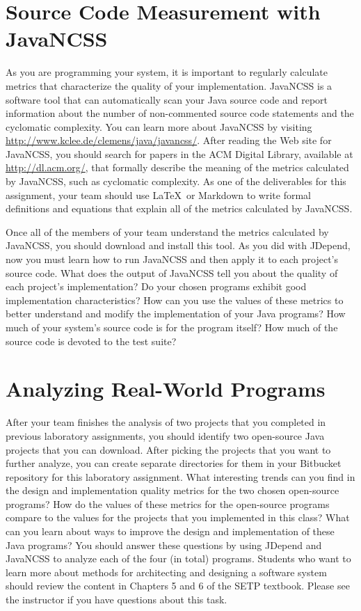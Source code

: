 \section*{Source Code Measurement with JavaNCSS}

As you are programming your system, it is important to regularly calculate metrics that characterize the quality of your
implementation.  JavaNCSS is a software tool that can automatically scan your Java source code and report information
about the number of non-commented source code statements and the cyclomatic complexity.  You can learn more about
JavaNCSS by visiting \url{http://www.kclee.de/clemens/java/javancss/}. After reading the Web site for JavaNCSS, you
should search for papers in the ACM Digital Library, available at \url{http://dl.acm.org/}, that formally describe the
meaning of the metrics calculated by JavaNCSS, such as cyclomatic complexity. As one of the deliverables for this
assignment, your team should use \LaTeX\ or Markdown to write formal definitions and equations that explain all of the
metrics calculated by JavaNCSS.

Once all of the members of your team understand the metrics calculated by JavaNCSS, you should download and install this
tool.  As you did with JDepend, now you must learn how to run JavaNCSS and then apply it to each project's source code.
What does the output of JavaNCSS tell you about the quality of each project's implementation? Do your chosen programs
exhibit good implementation characteristics? How can you use the values of these metrics to better understand and modify
the implementation of your Java programs? How much of your system's source code is for the program itself? How much of
the source code is devoted to the test suite?

\section*{Analyzing Real-World Programs}

After your team finishes the analysis of two projects that you completed in previous laboratory assignments, you should
identify two open-source Java projects that you can download.  After picking the projects that you want to further
analyze, you can create separate directories for them in your Bitbucket repository for this laboratory assignment.  What
interesting trends can you find in the design and implementation quality metrics for the two chosen open-source
programs?  How do the values of these metrics for the open-source programs compare to the values for the projects that
you implemented in this class?  What can you learn about ways to improve the design and implementation of these Java
programs? You should answer these questions by using JDepend and JavaNCSS to analyze each of the four (in total)
programs.  Students who want to learn more about methods for architecting and designing a software system should review
the content in Chapters 5 and 6 of the SETP textbook. Please see the instructor if you have questions about this task.

